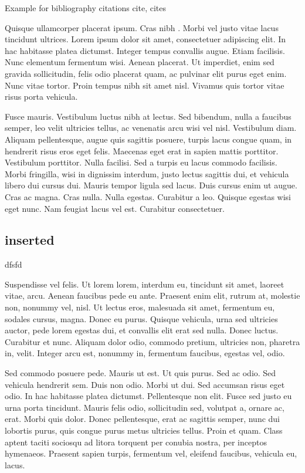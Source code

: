 \documentclass{wber}
\begin{document}
Example for bibliography citations cite,\citep{johnson-etc} cites\citep{anon-67}

Quisque ullamcorper placerat ipsum. Cras nibh \citep{aslin-49}. Morbi vel justo vitae lacus tincidunt ultrices. Lorem ipsum dolor sit
amet, consectetuer adipiscing elit. In hac habitasse platea dictumst. Integer tempus convallis augue. Etiam facilisis.
Nunc elementum fermentum wisi. Aenean placerat. Ut imperdiet, enim sed gravida sollicitudin, felis odio placerat
quam, ac pulvinar elit purus eget enim. Nunc vitae tortor. Proin tempus nibh sit amet nisl. Vivamus quis tortor
vitae risus porta vehicula.

Fusce mauris. Vestibulum luctus nibh at lectus. Sed bibendum, nulla a faucibus semper, leo velit ultricies tellus, ac
venenatis arcu wisi vel nisl. Vestibulum diam. Aliquam pellentesque, augue quis sagittis posuere, turpis lacus congue
quam, in hendrerit risus eros eget felis. Maecenas eget erat in sapien mattis porttitor. Vestibulum porttitor. Nulla facilisi. Sed a turpis eu lacus commodo facilisis. Morbi fringilla, wisi in dignissim interdum, justo lectus sagittis dui, et
vehicula libero dui cursus dui. Mauris tempor ligula sed lacus. Duis cursus enim ut augue. Cras ac magna. Cras nulla.
Nulla egestas. Curabitur a leo. Quisque egestas wisi eget nunc. Nam feugiat lacus vel est. Curabitur consectetuer.
\subsection{inserted}
dfsfd



Suspendisse vel felis. Ut lorem lorem, interdum eu, tincidunt sit amet, laoreet vitae, arcu. Aenean faucibus pede eu
ante. Praesent enim elit, rutrum at, molestie non, nonummy vel, nisl. Ut lectus eros, malesuada sit amet, fermentum
eu, sodales cursus, magna. Donec eu purus. Quisque vehicula, urna sed ultricies auctor, pede lorem egestas dui, et
convallis elit erat sed nulla. Donec luctus. Curabitur et nunc. Aliquam dolor odio, commodo pretium, ultricies non,
pharetra in, velit. Integer arcu est, nonummy in, fermentum faucibus, egestas vel, odio.

Sed commodo posuere pede. Mauris ut est. Ut quis purus. Sed ac odio. Sed vehicula hendrerit sem. Duis non
odio. Morbi ut dui. Sed accumsan risus eget odio. In hac habitasse platea dictumst. Pellentesque non elit. Fusce
sed justo eu urna porta tincidunt. Mauris felis odio, sollicitudin sed, volutpat a, ornare ac, erat. Morbi quis dolor.
Donec pellentesque, erat ac sagittis semper, nunc dui lobortis purus, quis congue purus metus ultricies tellus. Proin
et quam. Class aptent taciti sociosqu ad litora torquent per conubia nostra, per inceptos hymenaeos. Praesent sapien
turpis, fermentum vel, eleifend faucibus, vehicula eu, lacus.
\end{document}
